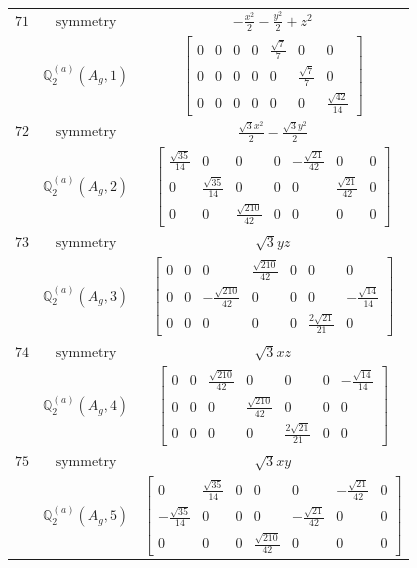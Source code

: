 \documentclass[fleqn,8pt,landscape]{jsarticle}
\begin{document}
\begin{longtable}{ccc}
$ 71 $ & $ \text{symmetry} $ & $ - \frac{x^{2}}{2} - \frac{y^{2}}{2} + z^{2} $ \\
$  $ & $ \mathbb{Q}_{2}^{(a)}(A_{g},1) $ & $ \begin{bmatrix} 0 & 0 & 0 & 0 & \frac{\sqrt{7}}{7} & 0 & 0 \\ 0 & 0 & 0 & 0 & 0 & \frac{\sqrt{7}}{7} & 0 \\ 0 & 0 & 0 & 0 & 0 & 0 & \frac{\sqrt{42}}{14} \end{bmatrix} $ \\ \hline
$ 72 $ & $ \text{symmetry} $ & $ \frac{\sqrt{3} x^{2}}{2} - \frac{\sqrt{3} y^{2}}{2} $ \\
$  $ & $ \mathbb{Q}_{2}^{(a)}(A_{g},2) $ & $ \begin{bmatrix} \frac{\sqrt{35}}{14} & 0 & 0 & 0 & - \frac{\sqrt{21}}{42} & 0 & 0 \\ 0 & \frac{\sqrt{35}}{14} & 0 & 0 & 0 & \frac{\sqrt{21}}{42} & 0 \\ 0 & 0 & \frac{\sqrt{210}}{42} & 0 & 0 & 0 & 0 \end{bmatrix} $ \\ \hline
$ 73 $ & $ \text{symmetry} $ & $ \sqrt{3} y z $ \\
$  $ & $ \mathbb{Q}_{2}^{(a)}(A_{g},3) $ & $ \begin{bmatrix} 0 & 0 & 0 & \frac{\sqrt{210}}{42} & 0 & 0 & 0 \\ 0 & 0 & - \frac{\sqrt{210}}{42} & 0 & 0 & 0 & - \frac{\sqrt{14}}{14} \\ 0 & 0 & 0 & 0 & 0 & \frac{2 \sqrt{21}}{21} & 0 \end{bmatrix} $ \\ \hline
$ 74 $ & $ \text{symmetry} $ & $ \sqrt{3} x z $ \\
$  $ & $ \mathbb{Q}_{2}^{(a)}(A_{g},4) $ & $ \begin{bmatrix} 0 & 0 & \frac{\sqrt{210}}{42} & 0 & 0 & 0 & - \frac{\sqrt{14}}{14} \\ 0 & 0 & 0 & \frac{\sqrt{210}}{42} & 0 & 0 & 0 \\ 0 & 0 & 0 & 0 & \frac{2 \sqrt{21}}{21} & 0 & 0 \end{bmatrix} $ \\ \hline
$ 75 $ & $ \text{symmetry} $ & $ \sqrt{3} x y $ \\
$  $ & $ \mathbb{Q}_{2}^{(a)}(A_{g},5) $ & $ \begin{bmatrix} 0 & \frac{\sqrt{35}}{14} & 0 & 0 & 0 & - \frac{\sqrt{21}}{42} & 0 \\ - \frac{\sqrt{35}}{14} & 0 & 0 & 0 & - \frac{\sqrt{21}}{42} & 0 & 0 \\ 0 & 0 & 0 & \frac{\sqrt{210}}{42} & 0 & 0 & 0 \end{bmatrix} $ \\ \hline

\end{longtable}
\end{document}
